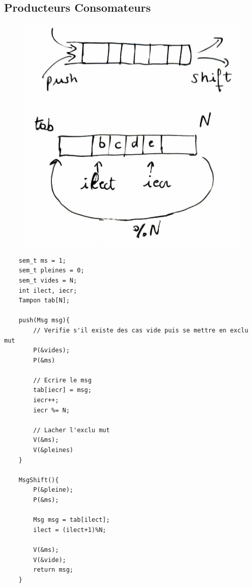 \documentclass[11pt]{article}
\begin{document}
\subsection{Producteurs Consomateurs}
\begin{figure}[h!]
    \centering
    \includegraphics[scale=0.2]{img/prod_cons.jpg}
\end{figure}
\begin{verbatim}
    sem_t ms = 1;
    sem_t pleines = 0;
    sem_t vides = N;
    int ilect, iecr;
    Tampon tab[N];

    push(Msg msg){
        // Verifie s'il existe des cas vide puis se mettre en exclu mut
        P(&vides);
        P(&ms)
        
        // Ecrire le msg
        tab[iecr] = msg;
        iecr++;
        iecr %= N;

        // Lacher l'exclu mut
        V(&ms);
        V(&pleines)
    }

    MsgShift(){
        P(&pleine);
        P(&ms);
        
        Msg msg = tab[ilect];
        ilect = (ilect+1)%N;

        V(&ms);
        V(&vide);
        return msg;
    }
\end{verbatim}
\end{document}
